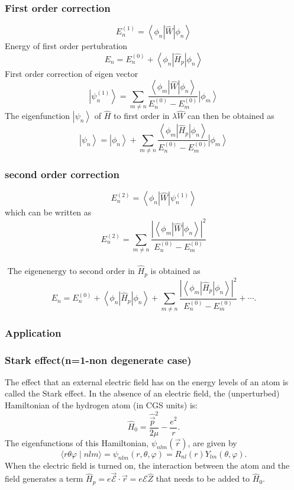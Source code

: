 \subsubsection{First order correction}
$$E_{n}^{(1)}=\left\langle\phi_{n}|\hat{W}| \phi_{n}\right\rangle$$
Energy of first order pertubration
$$E_{n}=E_{n}^{(0)}+\left\langle\phi_{n}\left|\hat{H}_{p}\right| \phi_{n}\right\rangle$$
First order correction of eigen vector\\
$$\left|\psi_{n}^{(1)}\right\rangle=\sum_{m \neq n} \frac{\left\langle\phi_{m}|\hat{W}| \phi_{n}\right\rangle}{E_{n}^{(0)}-E_{m}^{(0)}}\left|\phi_{m}\right\rangle$$
The eigenfunction $\left|\psi_{n}\right\rangle$ of $\hat{H}$ to first order in $\lambda \hat{W}$ can then be obtained as
$$
\left|\psi_{n}\right\rangle=\left|\phi_{n}\right\rangle+\sum_{m \neq n} \frac{\left\langle\phi_{m}\left|\hat{H}_{p}\right| \phi_{n}\right\rangle}{E_{n}^{(0)}-E_{m}^{(0)}}\left|\phi_{m}\right\rangle
$$
\subsubsection{second order correction}
$$E_{n}^{(2)}=\left\langle\phi_{n}|\hat{W}| \psi_{n}^{(1)}\right\rangle$$
which can be written as \\
$$E_{n}^{(2)}=\sum_{m \neq n} \frac{\left|\left\langle\phi_{m}|\hat{W}| \phi_{n}\right\rangle\right|^{2}}{E_{n}^{(0)}-E_{m}^{(0)}}$$\\
$\text { The eigenenergy to second order in } \hat{H}_{p}$ is obtained as 
$$E_{n}=E_{n}^{(0)}+\left\langle\phi_{n}\left|\hat{H}_{p}\right| \phi_{n}\right\rangle+\sum_{m \neq n} \frac{\left|\left\langle\phi_{m}\left|\hat{H}_{p}\right| \phi_{n}\right\rangle\right|^{2}}{E_{n}^{(0)}-E_{m}^{(0)}}+\cdots .$$
\subsubsection{Application}
\subsubsection{Stark effect(n=1-non degenerate case)}

 The effect that an external electric field has on the energy levels of an atom is called the Stark effect. In the absence of an electric field, the (unperturbed) Hamiltonian of the hydrogen atom (in CGS units) is:
$$
\hat{H}_{0}=\frac{\hat{\vec{p}}^{2}}{2 \mu}-\frac{e^{2}}{r} .
$$
The eigenfunctions of this Hamiltonian, $\psi_{n l m}(\vec{r})$, are given by
$$
\langle r \theta \varphi \mid n l m\rangle=\psi_{n l m}(r, \theta, \varphi)=R_{n l}(r) Y_{l m}(\theta, \varphi) .
$$
When the electric field is turned on, the interaction between the atom and the field generates a term $\hat{H}_{p}=e \overrightarrow{\mathcal{E}} \cdot \vec{r}=e \mathcal{E} \hat{Z}$ that needs to be added to $\hat{H}_{0}$.

